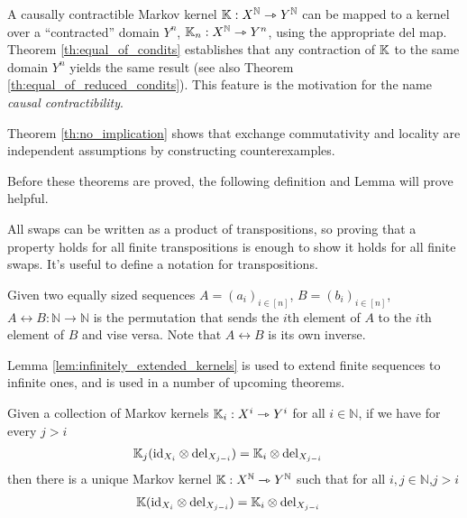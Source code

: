 A causally contractible Markov kernel $\mathbb{K}:X^{\mathbb{N}}\rightarrowtriangle Y^{\mathbb{N}}$ can be mapped to a kernel over a ``contracted'' domain $Y^n$, $\mathbb{K}_n:X^{\mathbb{N}}\rightarrowtriangle Y^n$, using the appropriate $\text{del}$ map. Theorem \ref{th:equal_of_condits} establishes that any contraction of $\mathbb{K}$ to the same domain $Y^n$ yields the same result (see also Theorem \ref{th:equal_of_reduced_condits}). This feature is the motivation for the name \emph{causal contractibility}. 

Theorem \ref{th:no_implication} shows that exchange commutativity and locality are independent assumptions by constructing counterexamples.

Before these theorems are proved, the following definition and Lemma will prove helpful.

All swaps can be written as a product of transpositions, so proving that a property holds for all finite transpositions is enough to show it holds for all finite swaps. It's useful to define a notation for transpositions.
\begin{definition}
Given two equally sized sequences $A=(a_i)_{i\in [n]}$, $B=(b_i)_{i\in [n]}$, ${A\leftrightarrow B}:\mathbb{N}\to \mathbb{N}$ is the permutation that sends the $i$th element of $A$ to the $i$th element of $B$ and vise versa. Note that $A\leftrightarrow B$ is its own inverse.
\end{definition}

Lemma \ref{lem:infinitely_extended_kernels} is used to extend finite sequences to infinite ones, and is used in a number of upcoming theorems.

\begin{lemma}\label{lem:infinitely_extended_kernels}
Given a collection of Markov kernels $\mathbb{K}_i:X^i\rightarrowtriangle Y^i$ for all $i\in \mathbb{N}$, if we have for every $j>i$
\begin{align}
    \mathbb{K}_j(\text{id}_{X_i}\otimes \text{del}_{X_{j-i}}) &= \mathbb{K}_i\otimes \text{del}_{X_{j-i}}\label{eq:marginalise_comb}
\end{align} 
then there is a unique Markov kernel $\mathbb{K}:X^{\mathbb{N}}\rightarrowtriangle Y^{\mathbb{N}}$ such that for all $i,j\in \mathbb{N}$,$j>i$
\begin{align}
    \mathbb{K}(\text{id}_{X_i}\otimes \text{del}_{X_{j-i}})&= \mathbb{K}_i\otimes \text{del}_{X_{j-i}}
\end{align}
\end{lemma}

